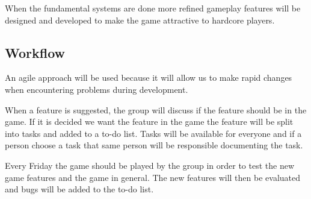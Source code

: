 When the fundamental systems are done more refined gameplay features will be designed and developed to make the game attractive to hardcore players.

\subsection{Workflow}
An agile approach will be used because it will allow us to make rapid changes when encountering problems during development.

When a feature is suggested, the group will discuss if the feature should be in the game.
If it is decided we want the feature in the game the feature will be split into tasks and added to a to-do list.
Tasks will be available for everyone and if a person choose a task that same person will be responsible documenting the task.

Every Friday the game should be played by the group in order to test the new game features and the game in general.
The new features will then be evaluated and bugs will be added to the to-do list.
